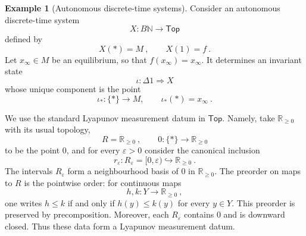 \documentclass[a4paper,reqno,oneside]{amsart}
\theoremstyle{definition}
\newtheorem{example}[theorem]{Example}
\theoremstyle{remark}
\numberwithin{equation}{section}
\begin{document}
\begin{example}[Autonomous discrete-time systems]\label{ex: Lyapunov discrete autonomous}
Consider an autonomous discrete-time system
\begin{equation}
    X\colon B\mathbb N\to\mathsf{Top}
\end{equation}
defined by
\begin{equation}
    X(*)=M \ ,
    \qquad
    X(1)=f \ .
\end{equation}
Let $x_\infty\in M$ be an equilibrium, so that $f(x_\infty)=x_\infty$. It determines an invariant state
\begin{equation}
    \iota\colon \Delta 1\Longrightarrow X
\end{equation}
whose unique component is the point
\begin{equation}
    \iota_*\colon \{*\}\to M,
    \qquad
    \iota_*(*)=x_\infty \ .
\end{equation}

We use the standard Lyapunov measurement datum in $\mathsf{Top}$. Namely,
take $\mathbb R_{\geq 0}$ with its usual topology,
\begin{equation}
    R=\mathbb R_{\geq 0} \ ,
    \qquad
    0\colon \{*\}\to \mathbb R_{\geq 0}
\end{equation}
to be the point $0$, and for every $\varepsilon>0$ consider the canonical inclusion
\begin{equation}
    r_\varepsilon\colon R_\varepsilon=[0,\varepsilon)
    \hookrightarrow
    \mathbb R_{\geq 0} \ .
\end{equation}
The intervals $R_\varepsilon$ form a neighbourhood basis of $0$ in
$\mathbb R_{\geq 0}$. The preorder on maps to $R$ is the pointwise order: for continuous maps
\begin{equation}
    h,k\colon Y\to \mathbb R_{\geq 0} \ ,
\end{equation}
one writes $h\leq k$ if and only if $h(y)\leq k(y)$ for every $y\in Y$. This preorder is preserved by precomposition. Moreover, each $R_\varepsilon$ contains $0$ and is downward closed. Thus these data form
a Lyapunov measurement datum.


\end{example}
\end{document}
